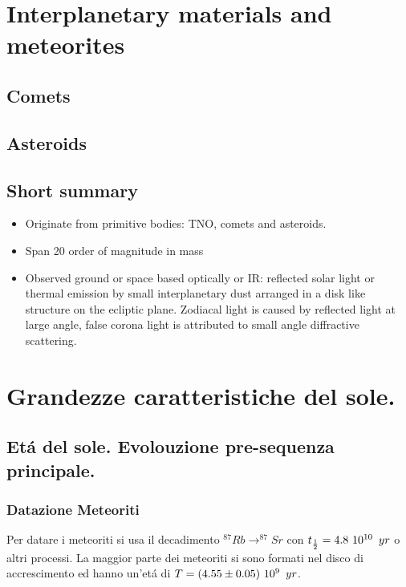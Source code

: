 \clearpage

\section{Interplanetary materials and meteorites}

\subsection{Comets}

\subsection{Asteroids}

\subsection{Short summary}
\begin{itemize}
\item Originate from primitive bodies: TNO, comets and asteroids.
\item Span 20 order of magnitude in mass
\item Observed ground or space based optically or IR: reflected solar light or thermal emission by small interplanetary dust arranged in a disk like structure on the ecliptic plane.
Zodiacal light is caused by reflected light at large angle, false corona light is attributed to small angle diffractive scattering.
\end{itemize}



\section{Grandezze caratteristiche del sole.}

\subsection{Et\'a del sole. Evolouzione pre-sequenza principale.}

\subsubsection{Datazione Meteoriti}

Per datare i meteoriti si usa il decadimento $^{87}Rb\to^{87}Sr$ con $t_{\frac{1}{2}}=4.8\ 10^{10}\ \,yr$ o altri processi. La maggior parte dei meteoriti si sono formati nel disco di accrescimento ed hanno un'et\'a di $T=(4.55\pm0.05)\ 10^{9}\ \,yr$.


